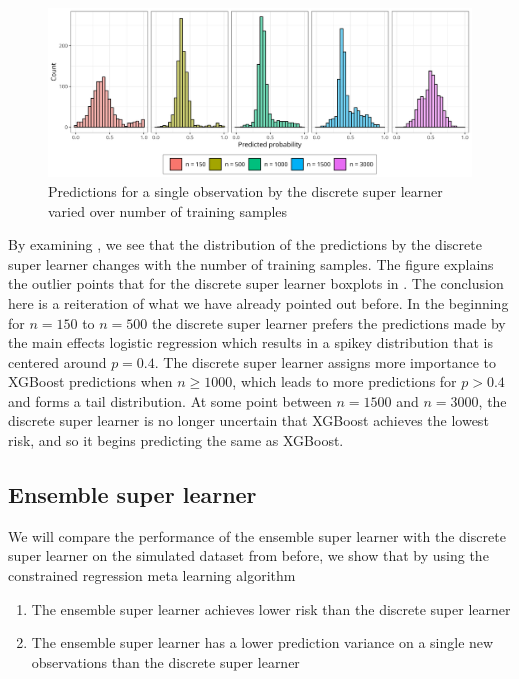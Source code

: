 \documentclass[./main.tex]{subfiles}
\begin{document}
\begin{figure}[H]
    \centering
    \includegraphics[width=\textwidth]{figures/preds_dsl_shift.png}
    \caption{Predictions for a single observation by the discrete super learner varied over number of training samples}
    \label{fig:dsl_shift}
\end{figure}
By examining , we see that the distribution of the predictions by the discrete super learner changes with the number of training samples. The figure explains the outlier points that for the discrete super learner boxplots in . The conclusion here is a reiteration of what we have already pointed out before. In the beginning for $ n = 150 $ to $ n = 500 $ the discrete super learner prefers the predictions made by the main effects logistic regression which results in a spikey distribution that is centered around $ p = 0.4 $. The discrete super learner assigns more importance to XGBoost predictions when $n \geq 1000$, which leads to more predictions for $p > 0.4$ and forms a tail distribution. At some point between $ n = 1500 $ and $ n = 3000 $, the discrete super learner is no longer uncertain that XGBoost achieves the lowest risk, and so it begins predicting the same as XGBoost. 

\subsection{Ensemble super learner}
We will compare the performance of the ensemble super learner with the discrete super learner on the simulated dataset from before, we show that by using the constrained regression meta learning algorithm
\begin{enumerate}
    \item The ensemble super learner achieves lower risk than the discrete super learner
    \item The ensemble super learner has a lower prediction variance on a single new observations than the discrete super learner
\end{enumerate}
\end{document}
